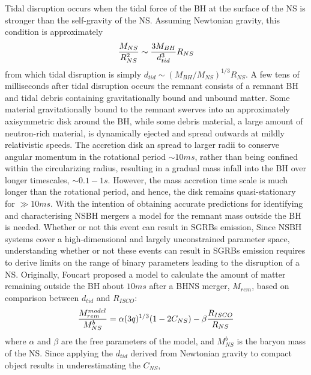 \documentclass[binding=0.6cm, LaM]{sapthesis}
\begin{document}
        Tidal disruption occurs when  the  tidal force of the BH at the surface of the NS is stronger
        than the self-gravity of the NS.  Assuming Newtonian gravity, this condition is approximately
                \begin{equation}
                        {{M_{NS}} \over {R_{NS}^2}} \sim {{3M_{BH}} \over {d_{tid}^3}}R_{NS}
                \end{equation}
        from which tidal disruption is simply $d_{tid} \sim (M_{BH}/M_{NS})^{1/3}R_{NS}$.
        A few tens of milliseconds after tidal disruption occurs the remnant consists of
        a remnant BH and tidal debris containing gravitationally bound and unbound matter.
        Some material gravitationally bound to the remnant swerves
        into an approximately axisymmetric disk around the BH, while some debris material,
        a large amount of neutron-rich material, is dynamically ejected and spread outwards at mildly relativistic speeds.
        The accretion disk an spread to larger radii to conserve angular momentum in the rotational period $\sim 10 ms$,
        rather than being confined within the circularizing radius, resulting in a gradual mass infall into the BH over longer timescales, $\sim 0.1-1 s$.
        However, the mass accretion time scale is much longer than the rotational period, and hence, the disk remains quasi-stationary for $\gg 10 ms$.
        With the intention of obtaining accurate predictions for identifying and characterising NSBH mergers
        a model for the remnant mass outside the BH is needed.
        Whether or not this event can result in SGRBs emission,
        Since NSBH systems cover a high-dimensional and largely unconstrained parameter space,
        understanding whether or not these events can result in SGRBs emission requires to
        derive limits on the range of binary parameters leading to the disruption of a NS.
        Originally, Foucart proposed a model to calculate the amount of matter remaining
        outside the BH about $10ms$ after a BHNS merger, $M_{rem}$, based on comparison
        between $d_{tid}$ and $R_{ISCO}$:
                \begin{equation}
                        {{M_{rem}^{model}} \over {M^b_{NS}}} = \alpha(3q)^{1/3}(1 - 2C_{NS}) - \beta{{R_{ISCO}} \over {R_{NS}}}
                \end{equation}
        where $\alpha$ and $\beta$ are the free parameters of the model,
        and $M^b_{NS}$ is the baryon mass of the NS.
        Since applying the $d_{tid}$ derived from Newtonian gravity to compact object results in underestimating the $C_{NS}$,
\end{document}
